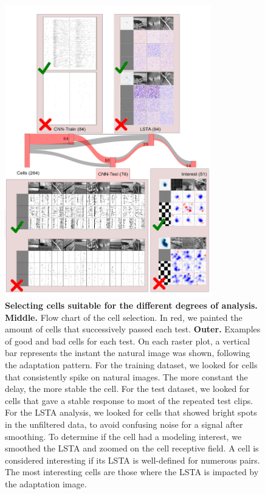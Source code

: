 \begin{figure}
    \centering
    \vspace*{-3cm}
    \includegraphics[width=0.8\textwidth]{pics/CellSelection.png}
    \caption{\textbf{Selecting cells suitable for the different degrees
            of
            analysis.} \textbf{Middle.} Flow chart of the cell selection. In
        red, we painted the amount of cells that successively passed each test.
        \textbf{Outer.} Examples of good and
        bad cells
        for each test. On each raster plot, a vertical bar represents the
        instant the natural image was shown, following the adaptation pattern.
        For the
        training dataset, we looked for cells that
        consistently spike on natural images. The more constant the delay, the
        more
        stable the cell. For the test dataset, we looked for cells that gave a
        stable
        response to most of the repeated test clips. For the LSTA analysis, we
        looked
        for cells that showed bright spots in the unfiltered data, to avoid
        confusing
        noise for a signal after smoothing. To determine if the cell had a
        modeling
        interest, we smoothed the LSTA and zoomed on the cell receptive field.
        A cell
        is considered interesting if its LSTA is well-defined for numerous
        pairs. The
        most interesting cells are those where the LSTA is impacted by the
        adaptation
        image.}
    \label{fig:cell_selection}
\end{figure}

